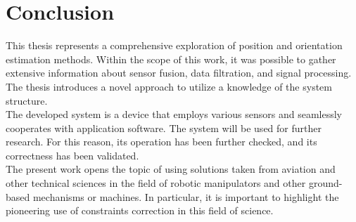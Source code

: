 \chapter{Conclusion}

This thesis represents a comprehensive exploration of position and orientation estimation methods. Within the scope of this work, it was possible to gather extensive information about sensor fusion, data filtration, and signal processing. The thesis introduces a novel approach to utilize a knowledge of the system structure.\\

The developed system is a device that employs various sensors and seamlessly cooperates with application software. The system will be used for further research. For this reason, its operation has been further checked, and its correctness has been validated.\\

The present work opens the topic of using solutions taken from aviation and other technical sciences in the field of robotic manipulators and other ground-based mechanisms or machines. In particular, it is important to highlight the pioneering use of constraints correction in this field of science.




